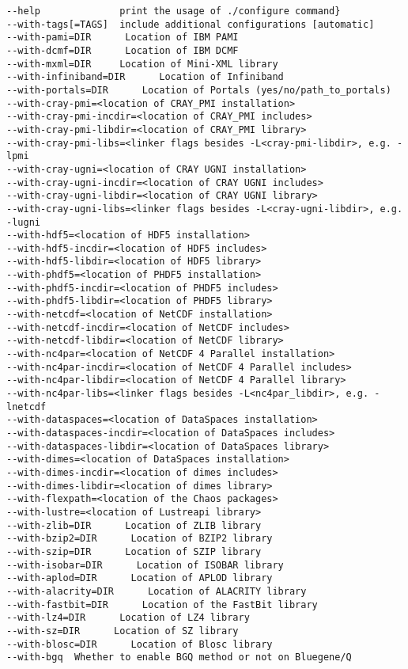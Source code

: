 \begin{lstlisting}
--help              print the usage of ./configure command}
--with-tags[=TAGS]  include additional configurations [automatic]
--with-pami=DIR      Location of IBM PAMI
--with-dcmf=DIR      Location of IBM DCMF
--with-mxml=DIR     Location of Mini-XML library
--with-infiniband=DIR      Location of Infiniband
--with-portals=DIR      Location of Portals (yes/no/path_to_portals)
--with-cray-pmi=<location of CRAY_PMI installation>
--with-cray-pmi-incdir=<location of CRAY_PMI includes>
--with-cray-pmi-libdir=<location of CRAY_PMI library>
--with-cray-pmi-libs=<linker flags besides -L<cray-pmi-libdir>, e.g. -lpmi
--with-cray-ugni=<location of CRAY UGNI installation>
--with-cray-ugni-incdir=<location of CRAY UGNI includes>
--with-cray-ugni-libdir=<location of CRAY UGNI library>
--with-cray-ugni-libs=<linker flags besides -L<cray-ugni-libdir>, e.g. -lugni
--with-hdf5=<location of HDF5 installation>
--with-hdf5-incdir=<location of HDF5 includes>
--with-hdf5-libdir=<location of HDF5 library>
--with-phdf5=<location of PHDF5 installation>
--with-phdf5-incdir=<location of PHDF5 includes>
--with-phdf5-libdir=<location of PHDF5 library>
--with-netcdf=<location of NetCDF installation>
--with-netcdf-incdir=<location of NetCDF includes>
--with-netcdf-libdir=<location of NetCDF library>
--with-nc4par=<location of NetCDF 4 Parallel installation>
--with-nc4par-incdir=<location of NetCDF 4 Parallel includes>
--with-nc4par-libdir=<location of NetCDF 4 Parallel library>
--with-nc4par-libs=<linker flags besides -L<nc4par_libdir>, e.g. -lnetcdf
--with-dataspaces=<location of DataSpaces installation>
--with-dataspaces-incdir=<location of DataSpaces includes>
--with-dataspaces-libdir=<location of DataSpaces library>
--with-dimes=<location of DataSpaces installation>
--with-dimes-incdir=<location of dimes includes>
--with-dimes-libdir=<location of dimes library>
--with-flexpath=<location of the Chaos packages>
--with-lustre=<location of Lustreapi library>
--with-zlib=DIR      Location of ZLIB library
--with-bzip2=DIR      Location of BZIP2 library
--with-szip=DIR      Location of SZIP library
--with-isobar=DIR      Location of ISOBAR library
--with-aplod=DIR      Location of APLOD library
--with-alacrity=DIR      Location of ALACRITY library
--with-fastbit=DIR      Location of the FastBit library
--with-lz4=DIR      Location of LZ4 library
--with-sz=DIR      Location of SZ library
--with-blosc=DIR      Location of Blosc library
--with-bgq 	Whether to enable BGQ method or not on Bluegene/Q
\end{lstlisting}

